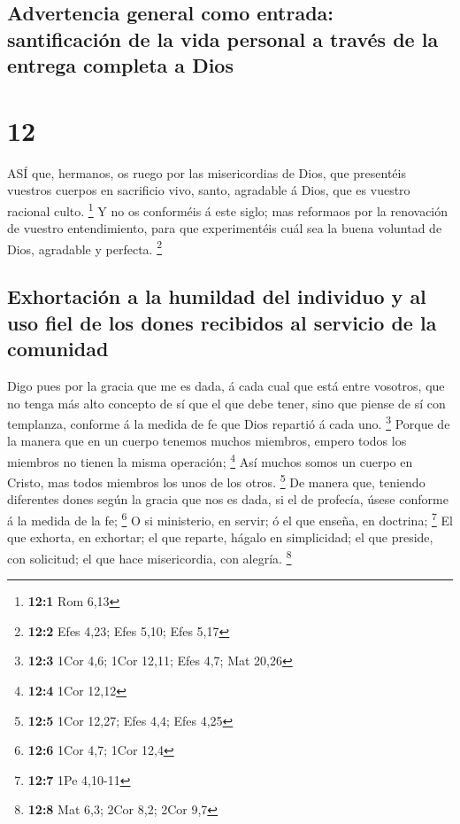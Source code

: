 \hypertarget{advertencia-general-como-entrada-santificaciuxf3n-de-la-vida-personal-a-travuxe9s-de-la-entrega-completa-a-dios}{%
\subsection{Advertencia general como entrada: santificación de la vida
personal a través de la entrega completa a
Dios}\label{advertencia-general-como-entrada-santificaciuxf3n-de-la-vida-personal-a-travuxe9s-de-la-entrega-completa-a-dios}}

\hypertarget{section-11}{%
\section{12}\label{section-11}}

 ASÍ que, hermanos, os ruego por las misericordias de Dios,
que presentéis vuestros cuerpos en sacrificio vivo, santo, agradable á
Dios, que es vuestro racional culto. \footnote{\textbf{12:1} Rom 6,13}
 Y no os conforméis á este siglo; mas reformaos por la
renovación de vuestro entendimiento, para que experimentéis cuál sea la
buena voluntad de Dios, agradable y perfecta. \footnote{\textbf{12:2}
  Efes 4,23; Efes 5,10; Efes 5,17}

\hypertarget{exhortaciuxf3n-a-la-humildad-del-individuo-y-al-uso-fiel-de-los-dones-recibidos-al-servicio-de-la-comunidad}{%
\subsection{Exhortación a la humildad del individuo y al uso fiel de los
dones recibidos al servicio de la
comunidad}\label{exhortaciuxf3n-a-la-humildad-del-individuo-y-al-uso-fiel-de-los-dones-recibidos-al-servicio-de-la-comunidad}}

 Digo pues por la gracia que me es dada, á cada cual que
está entre vosotros, que no tenga más alto concepto de sí que el que
debe tener, sino que piense de sí con templanza, conforme á la medida de
fe que Dios repartió á cada uno. \footnote{\textbf{12:3} 1Cor 4,6; 1Cor
  12,11; Efes 4,7; Mat 20,26}  Porque de la manera que en un
cuerpo tenemos muchos miembros, empero todos los miembros no tienen la
misma operación; \footnote{\textbf{12:4} 1Cor 12,12}  Así
muchos somos un cuerpo en Cristo, mas todos miembros los unos de los
otros. \footnote{\textbf{12:5} 1Cor 12,27; Efes 4,4; Efes 4,25}
 De manera que, teniendo diferentes dones según la gracia
que nos es dada, si el de profecía, úsese conforme á la medida de la fe;
\footnote{\textbf{12:6} 1Cor 4,7; 1Cor 12,4}  O si
ministerio, en servir; ó el que enseña, en doctrina; \footnote{\textbf{12:7}
  1Pe 4,10-11}  El que exhorta, en exhortar; el que reparte,
hágalo en simplicidad; el que preside, con solicitud; el que hace
misericordia, con alegría. \footnote{\textbf{12:8} Mat 6,3; 2Cor 8,2;
  2Cor 9,7}

